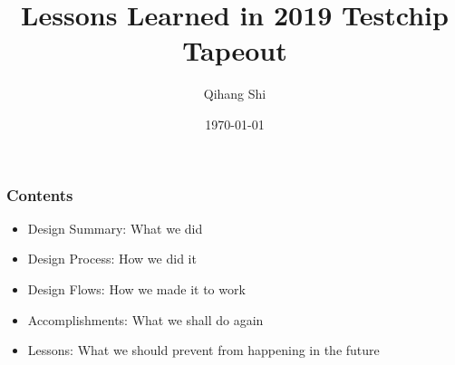 \documentclass[aspectratio=169]{beamer}
\title{\huge Lessons Learned in 2019 Testchip Tapeout}
\author{Qihang Shi}
\institute{Florida Institute of Cybersecurity (FICS)}
\date{\today}
\begin{document}
\titleframe






\begin{frame}
\frametitle{Contents}
\begin{itemize}
\item Design Summary: What we did
\item Design Process: How we did it
\item Design Flows: How we made it to work
\item Accomplishments: What we shall do again
\item Lessons: What we should prevent from happening in the future
\end{itemize}
\end{frame}

%
%
%
%
\end{document}

